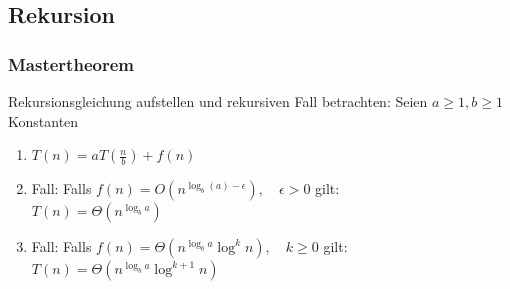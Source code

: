 \subsection{Rekursion}
\begin{emphbox}
\subsubsection{Mastertheorem}
Rekursionsgleichung aufstellen und rekursiven Fall betrachten: Seien $a \ge 1, b \ge 1$ Konstanten
\begin{enumerate}
    \item[] $T(n)=aT(\frac nb)+f(n)$
    \item Fall: Falls $f(n)=O(n^{\log_b(a)-\epsilon}), \quad \epsilon > 0$ gilt:\\
          $T(n)=\Theta(n^{\log_b a})$
    \item Fall: Falls $f(n)=\Theta(n^{\log_b a}\log^k n), \quad k \ge 0$ gilt: \\
          $T(n)=\Theta(n^{\log_b a}\log^{k+1}n)$
\end{enumerate}
\end{emphbox}